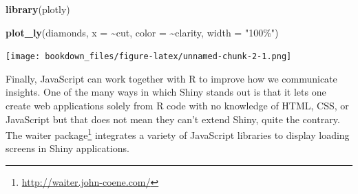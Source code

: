 \documentclass[
]{krantz}
\makeatletter
\newenvironment{Shaded}{\begin{snugshade}}{\end{snugshade}}
\newcommand{\CommentTok}[1]{\textcolor[rgb]{0.37,0.37,0.37}{\textit{#1}}}
\newcommand{\ControlFlowTok}[1]{\textcolor[rgb]{0.27,0.27,0.27}{\textbf{#1}}}
\newcommand{\DataTypeTok}[1]{\textcolor[rgb]{0.27,0.27,0.27}{#1}}
\newcommand{\DecValTok}[1]{\textcolor[rgb]{0.06,0.06,0.06}{#1}}
\newcommand{\KeywordTok}[1]{\textcolor[rgb]{0.27,0.27,0.27}{\textbf{#1}}}
\newcommand{\NormalTok}[1]{#1}
\newcommand{\OperatorTok}[1]{\textcolor[rgb]{0.43,0.43,0.43}{\textbf{#1}}}
\newcommand{\StringTok}[1]{\textcolor[rgb]{0.5,0.5,0.5}{#1}}
\renewcommand{\href}[2]{#2\footnote{\url{#1}}}
\newenvironment{kframe}{%
\medskip{}
\setlength{\fboxsep}{.8em}
 \def\at@end@of@kframe{}%
 \ifinner\ifhmode%
  \def\at@end@of@kframe{\end{minipage}}%
  \begin{minipage}{\columnwidth}%
 \fi\fi%
 \def\FrameCommand##1{\hskip\@totalleftmargin \hskip-\fboxsep
 \colorbox{shadecolor}{##1}\hskip-\fboxsep
     \hskip-\linewidth \hskip-\@totalleftmargin \hskip\columnwidth}%
 \MakeFramed {\advance\hsize-\width
   \@totalleftmargin\z@ \linewidth\hsize
   \@setminipage}}%
 {\par\unskip\endMakeFramed%
 \at@end@of@kframe}
\renewenvironment{Shaded}{\begin{kframe}}{\end{kframe}}
\makeatother
\begin{document}
\begin{Shaded}
\begin{Highlighting}[]
\KeywordTok{library}\NormalTok{(plotly)}

\KeywordTok{plot\_ly}\NormalTok{(diamonds, }\DataTypeTok{x =} \OperatorTok{\textasciitilde{}}\NormalTok{cut, }\DataTypeTok{color =} \OperatorTok{\textasciitilde{}}\NormalTok{clarity, }\DataTypeTok{width =} \StringTok{"100\%"}\NormalTok{)}
\end{Highlighting}
\end{Shaded}

\texttt{[image: bookdown\_files/figure-latex/unnamed-chunk-2-1.png]}

Finally, JavaScript can work together with R to improve how we communicate insights. One of the many ways in which Shiny stands out is that it lets one create web applications solely from R code with no knowledge of HTML, CSS, or JavaScript but that does not mean they can't extend Shiny, quite the contrary. The \href{http://waiter.john-coene.com/}{waiter package} \citep{R-waiter} integrates a variety of JavaScript libraries to display loading screens in Shiny applications.

\begin{Shaded}
\end{Shaded}
\end{document}
